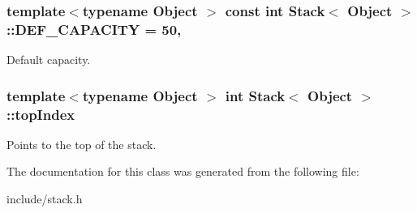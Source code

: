 \subsubsection[{D\+E\+F\+\_\+\+C\+A\+P\+A\+C\+I\+TY}]{\setlength{\rightskip}{0pt plus 5cm}template$<$typename Object $>$ const int {\bf Stack}$<$ Object $>$\+::D\+E\+F\+\_\+\+C\+A\+P\+A\+C\+I\+TY = 50\hspace{0.3cm}{\ttfamily [static]}, {\ttfamily [private]}}\hypertarget{classStack_ace70f66cadde9cb3a090e6915eb529aa}{}\label{classStack_ace70f66cadde9cb3a090e6915eb529aa}
Default capacity. 
\subsubsection[{top\+Index}]{\setlength{\rightskip}{0pt plus 5cm}template$<$typename Object $>$ int {\bf Stack}$<$ Object $>$\+::top\+Index\hspace{0.3cm}{\ttfamily [private]}}\hypertarget{classStack_a474893fc0e2f8f87ccd70c09d022439c}{}\label{classStack_a474893fc0e2f8f87ccd70c09d022439c}
Points to the top of the stack. 

The documentation for this class was generated from the following file\+:\begin{DoxyCompactItemize}
\item 
include/stack.\+h\end{DoxyCompactItemize}
